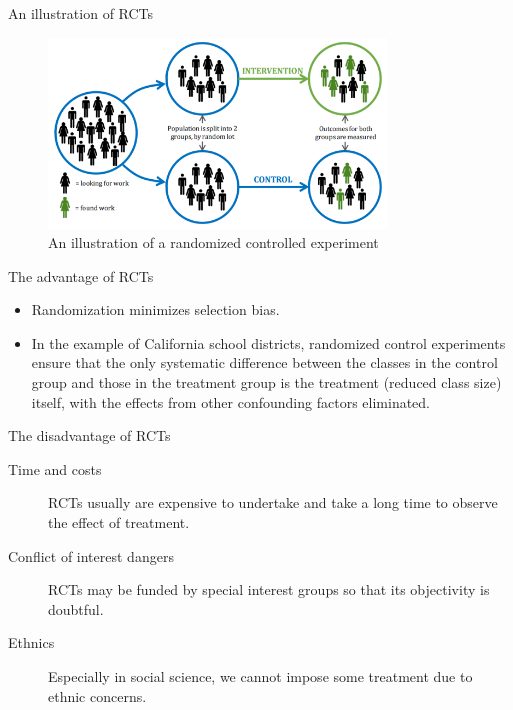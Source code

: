 \documentclass[presentation]{beamer}
\begin{document}
\begin{frame}[label={sec:org2afdb73}]{An illustration of RCTs}
\begin{figure}[htbp]
\centering
\includegraphics[width=0.8\textwidth,height=0.6\textheight]{figure/rct_example.png}
\caption{\label{fig:orgfb88e5a}
An illustration of a randomized controlled experiment}
\end{figure}
\end{frame}

\begin{frame}[label={sec:org13e74eb}]{The advantage of RCTs}
\begin{itemize}
\item Randomization minimizes selection bias.
\item In the example of California school districts,
randomized control experiments ensure that the only systematic difference
between the classes in the control group and those in the treatment
group is the treatment (reduced class size) itself, with the effects
from other \alert{confounding factors} eliminated.
\end{itemize}
\end{frame}

\begin{frame}[label={sec:orga8685ec}]{The disadvantage of RCTs}
\begin{description}
\item[{Time and costs}] RCTs usually are expensive to undertake and take a
long time to observe the effect of treatment.
\item[{Conflict of interest dangers}] RCTs may be funded by special interest
groups so that its objectivity is doubtful.
\item[{Ethnics}] Especially in social science, we cannot impose some
treatment due to ethnic concerns.
\end{description}
\end{frame}
\end{document}
